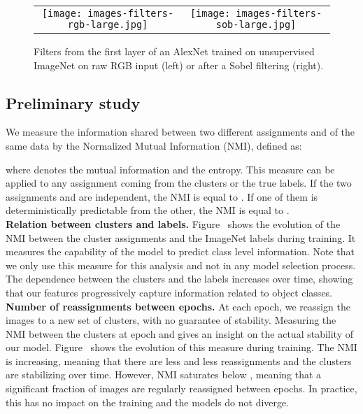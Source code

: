 \documentclass[runningheads]{llncs}
\begin{document}
\begin{figure}[t]
  \centering
  \begin{tabular}{cc}
    \texttt{[image: images-filters-rgb-large.jpg]}&
    \texttt{[image: images-filters-sob-large.jpg]}
  \end{tabular}
  \caption{Filters from the first layer of an AlexNet trained on unsupervised ImageNet on raw RGB input (left) or after a Sobel filtering (right).
  }
  \label{fig:filters}
\end{figure}

\subsection{Preliminary study}

We measure the information shared between two different assignments  and  of the same data by the
Normalized Mutual Information (NMI), defined as:

where  denotes the mutual information and  the entropy. This measure can be applied to any assignment coming
from the clusters or the true labels.
If the two assignments  and  are independent, the NMI is equal to .
If one of them is deterministically predictable from the other, the NMI is equal to .
\\

\noindent\textbf{Relation between clusters and labels.}
Figure~ shows the evolution of the NMI between the cluster assignments and the ImageNet labels during training.
It measures the capability of the model to predict class level information.
Note that we only use this measure for this analysis and not in any model selection process.
The dependence between the clusters and the labels increases over time, showing that our features progressively capture information
related to object classes.
\\

\noindent\textbf{Number of reassignments between epochs.}
At each epoch, we reassign the images to a new set of clusters, with no guarantee of stability.
Measuring the NMI between the clusters at epoch  and  gives an insight on the actual
stability of our model.
Figure~ shows the evolution of this measure during training.
The NMI is increasing, meaning that there are less and less reassignments and the clusters are stabilizing over time.
However, NMI saturates below , meaning that a significant fraction of images are regularly reassigned between epochs.
In practice, this has no impact on the training and the models do not diverge.
\\
\end{document}

